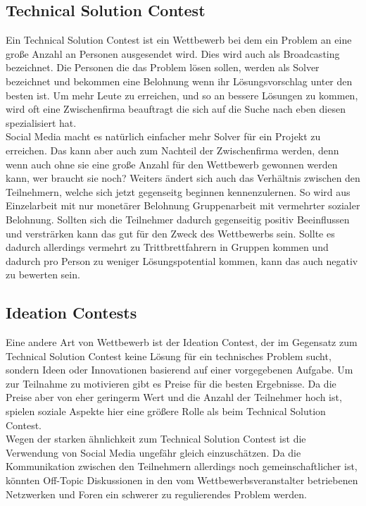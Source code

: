 \subsection{Technical Solution Contest}
Ein Technical Solution Contest ist ein Wettbewerb bei dem ein Problem an eine gro\ss{}e Anzahl an Personen ausgesendet wird. Dies wird auch als Broadcasting bezeichnet. Die Personen die das Problem l\"osen sollen, werden als Solver bezeichnet und bekommen eine Belohnung wenn ihr L\"osungsvorschlag unter den besten ist. Um mehr Leute zu erreichen, und so an bessere L\"osungen zu kommen, wird oft eine Zwischenfirma beauftragt die sich auf die Suche nach eben diesen spezialisiert hat.\\
Social Media macht es nat\"urlich einfacher mehr Solver f\"ur ein Projekt zu erreichen. Das kann aber auch zum Nachteil der Zwischenfirma werden, denn wenn auch ohne sie eine gro\ss{}e Anzahl f\"ur den Wettbewerb gewonnen werden kann, wer braucht sie noch? Weiters \"andert sich auch das Verh\"altnis zwischen den Teilnehmern, welche sich jetzt gegenseitg beginnen kennenzulernen. So wird aus Einzelarbeit mit nur monet\"arer Belohnung Gruppenarbeit mit vermehrter sozialer Belohnung. Sollten sich die Teilnehmer dadurch gegenseitig positiv Beeinflussen und verstr\"arken kann das gut f\"ur den Zweck des Wettbewerbs sein. Sollte es dadurch allerdings vermehrt zu Trittbrettfahrern in Gruppen kommen und dadurch pro Person zu weniger L\"osungspotential kommen, kann das auch negativ zu bewerten sein.
\subsection{Ideation Contests}
Eine andere Art von Wettbewerb ist der Ideation Contest, der im Gegensatz zum Technical Solution Contest keine L\"osung f\"ur ein technisches Problem sucht, sondern Ideen oder Innovationen basierend auf einer vorgegebenen Aufgabe. Um zur Teilnahme zu motivieren gibt es Preise f\"ur die besten Ergebnisse. Da die Preise aber von eher geringerm Wert und die Anzahl der Teilnehmer hoch ist, spielen soziale Aspekte hier eine gr\"o\ss{}ere Rolle als beim Technical Solution Contest.\\
Wegen der starken \"ahnlichkeit zum  Technical Solution Contest ist die Verwendung von Social Media ungef\"ahr gleich einzusch\"atzen. Da die Kommunikation zwischen den Teilnehmern allerdings noch gemeinschaftlicher ist, k\"onnten Off-Topic Diskussionen in den vom Wettbewerbsveranstalter betriebenen Netzwerken und Foren ein schwerer zu regulierendes Problem werden.